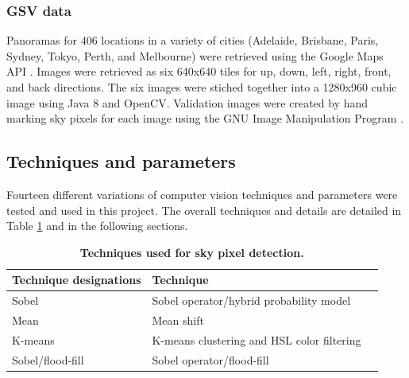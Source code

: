 \documentclass[final,3p,times,authoryear]{elsarticle}
\begin{document}
\subsubsection{GSV data}\label{sec:gsvdata}
Panoramas for 406 locations in a variety of cities (Adelaide, Brisbane, Paris, Sydney, Tokyo, Perth, and Melbourne) were retrieved using the Google Maps API \citep{GoogleMaps2017b}. Images were retrieved as six 640x640 tiles for up, down, left, right, front, and back directions. The six images were stiched together into a 1280x960 cubic image using Java 8 \citep{Oracle2018} and OpenCV\citep {Bradski2000}. Validation images were created by hand marking sky pixels for each image using the GNU Image Manipulation Program \citep{GIMP2019}.

\subsection{Techniques and parameters}
Fourteen different variations of computer vision techniques and parameters were tested and used in this project. The overall techniques and details are detailed in Table \ref{tab:techniques} and in the following sections.

\begin{table}[!htbp]
\caption{\bf Techniques used for sky pixel detection.  \label{tab:techniques}}     
\begin{tabular}{ l  l l}
\textbf{Technique designations} & \textbf{Technique}  \\ \hline
Sobel  & Sobel operator/hybrid probability model \\	
Mean &  Mean shift \\
K-means  & K-means clustering and HSL color filtering \\
Sobel/flood-fill  & Sobel operator/flood-fill \\
\hline
\end{tabular}
\end{table}
\end{document}
